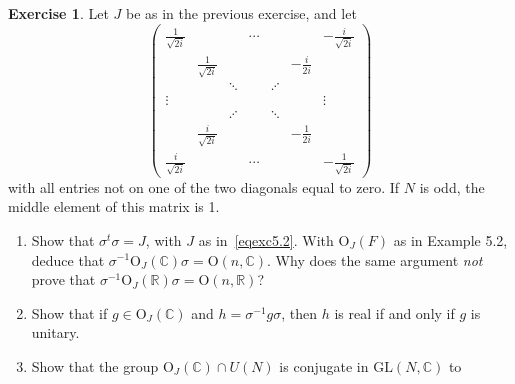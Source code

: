 \documentclass[12pt,reqno]{book}%
\theoremstyle{definition}
\newtheorem{exercise}{Exercise}[chapter]
\theoremstyle{remark}
\theoremstyle{theorem}
\theoremstyle{remark}
\begin{document}
\begin{exercise}\label{}
    Let $J$ be as in the previous exercise, and let
    \[
        \begin{pmatrix}
            \frac{1}{\sqrt{2i}} & & & \cdots & & & -\frac{i}{\sqrt{2i}} \\ %
            & \frac{1}{\sqrt{2i}} & & & & -\frac{i}{2i} & \\
            & & \ddots & & \iddots & & \\
            \vdots & & & & & & \vdots \\
            & & \iddots & & \ddots & & \\
            & \frac{i}{\sqrt{2i}} & & & & -\frac{1}{2i} & \\
            \frac{i}{\sqrt{2i}} & & & \cdots & & & -\frac{1}{\sqrt{2i}}
        \end{pmatrix}
    \]
    with all entries not on one of the two diagonals equal to zero.
    If $N$ is odd, the middle element of this matrix is 1.
    \begin{enumerate}[label= (\roman*),font=\normalfont,before=\normalfont]
        \item Show that $\sigma^t \sigma = J$, with $J$ as in~\eqref{eqexc5.2}.
            With $\mathrm{O}_J(F)$ as in Example 5.2, deduce that $\sigma^{-1} \mathrm{O}_J(\mathbb{C})\sigma = \mathrm{O}(n, \mathbb{C})$.
            Why does the same argument \emph{not} prove that $\sigma^{-1}\mathrm{O}_J(\mathbb{R}) \sigma = \mathrm{O}(n, \mathbb{R})$?
        \item Show that if $g \in \mathrm{O}_J(\mathbb{C})$ and $h = \sigma^{-1}g\sigma$, then $h$ is real if and only if $g$ is unitary.
        \item Show that the group $\mathrm{O}_J(\mathbb{C}) \cap U(N)$ is conjugate in $\mathrm{GL}(N, \mathbb{C})$ to 
    \end{enumerate}
\end{exercise}
\end{document}
